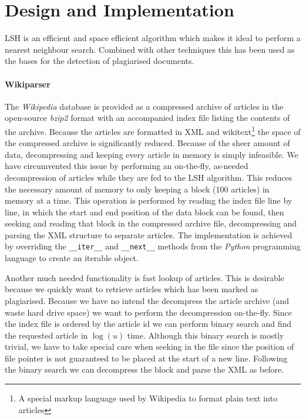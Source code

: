 \section{Design and Implementation}
LSH is an efficient and space efficient algorithm which makes it ideal to perform a nearest neighbour search. Combined with other techniques this has been used as the bases for the detection of plagiarised documents.



\paragraph{Wikiparser}
The \emph{Wikipedia} database is provided as a compressed archive of articles in the open-source \emph{bzip2} format with an accompanied index file listing the contents of the archive. Because the articles are formatted in XML and wikitext\footnote{A special markup language used by Wikipedia to format plain text into articles} the space of the compressed archive is significantly reduced. Because of the sheer amount of data, decompressing and keeping every article in memory is simply infeasible. We have circumvented this issue by performing an on-the-fly, as-needed decompression of articles while they are fed to the LSH algorithm. This reduces the necessary amount of memory to only keeping a block (100 articles) in memory at a time. This operation is performed by reading the index file line by line, in which the start and end position of the data block can be found, then seeking and reading that block in the compressed archive file, decompressing and parsing the XML structure to separate articles. The implementation is achieved by overriding the \texttt{\_\_iter\_\_} and \texttt{\_\_next\_\_} methods from the \emph{Python} programming language to create an iterable object.

Another much needed functionality is fast lookup of articles. This is desirable because we quickly want to retrieve articles which has been marked as plagiarised. Because we have no intend the decompress the article archive (and waste hard drive space) we want to perform the decompression on-the-fly. Since the index file is ordered by the article id we can perform binary search and find the requested article in $\log(u)$ time. Although this binary search is mostly trivial, we have to take special care when seeking in the file since the position of file pointer is not guaranteed to be placed at the start of a new line. Following the binary search we can decompress the block and parse the XML as before.

